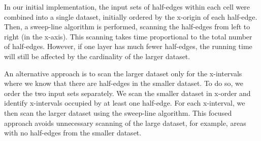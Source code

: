 In our initial implementation, the input sets of half-edges within each cell were combined into a single dataset, initially ordered by the x-origin of each half-edge.
Then, a sweep-line algorithm is performed, scanning the half-edges from left to right (in the x-axis). This scanning takes time proportional to the total number of half-edges. However, if one layer has much fewer half-edges, the running time will still be affected by the cardinality of the larger dataset.

An alternative approach is to scan the larger dataset only for the x-intervals where we know that there are half-edges in the smaller dataset. To do so, we order the two input sets separately. We scan the smaller dataset in x-order and identify x-intervals occupied by at least one half-edge. For each x-interval, we then scan the larger dataset using the sweep-line algorithm. This focused approach avoids unnecessary scanning of the large dataset, for example, areas with no half-edges from the smaller dataset.
